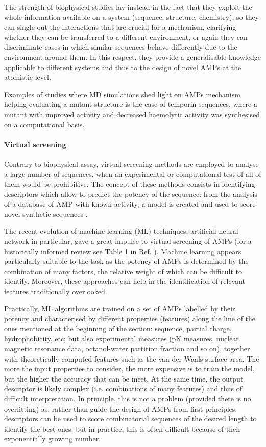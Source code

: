 The strength of biophysical studies lay instead in the fact that they exploit the whole information available on a system (sequence, structure, chemistry), so they can single out the interactions that are crucial for a mechanism, clarifying whether they can be transferred to a different environment, or again they can discriminate cases in which similar sequences behave differently due to the environment around them. In this respect, they provide a generalisable knowledge applicable to different systems and thus to the design of novel AMPs at the atomistic level.

Examples of studies where MD simulations shed light on AMPs mechanism helping evaluating a mutant structure is the case of temporin \cite{Farrotti2017} sequences, where a mutant with improved activity and decreased haemolytic activity was synthesised on a computational basis.

\paragraph{Virtual screening}
Contrary to biophysical assay, virtual screening methods are employed to analyse a large number of sequences, when an experimental or computational test of all of them would be prohibitive. The concept of these methods consists in identifying descriptors which allow to predict the potency of the sequence: from the analysis of a database of AMP with known activity, a model is created and used to score novel synthetic sequences \cite{Fjell2011}.

The recent evolution of machine learning (ML) techniques, artificial neural network in particular, gave a great impulse to virtual screening of AMPs (for a historically informed review see Table 1 in Ref. \cite{Fjell2011}). Machine learning appears particularly suitable to the task as the potency of AMPs is determined by the combination of many factors, the relative weight of which can be difficult to identify. Moreover, these approaches can help in the identification of relevant features traditionally overlooked.

Practically, ML algorithms are trained on a set of AMPs labelled by their potency and characterised by different properties (features) along the line of the ones mentioned at the beginning of the section: sequence, partial charge, hydrophobicity, etc; but also experimental measures (pK measures, nuclear magnetic resonance data, octanol-water partition fraction and so on), together with theoretically computed features such as the van der Waals surface area.
%
The more the input properties to consider, the more expensive is to train the model, but the higher the accuracy that can be meet. At the same time, the output descriptor is likely complex (i.e. combinations of many features) and thus of difficult interpretation.
%
In principle, this is not a problem (provided there is no overfitting) as, rather than guide the design of AMPs from first principles, descriptors can be used to score combinatorial sequences of the desired length to identify the best ones, but in practice, this is often difficult because of their exponentially growing number.

